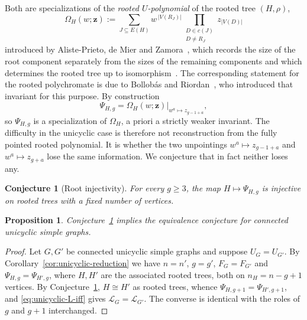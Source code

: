 \documentclass[11pt]{article}
\theoremstyle{plain}
\newtheorem{proposition}[theorem]{Proposition}
\newtheorem{conjecture}[theorem]{Conjecture}
\theoremstyle{definition}
\renewcommand{\mathcal}{\mathscr}
\newcommand{\LL}{\mathcal{L}}    %
\newcommand{\bz}{\mathbf{z}}
\numberwithin{equation}{section}
\begin{document}
Both are specializations of the \emph{rooted $U$-polynomial} of the rooted tree $(H,\rho)$,
\begin{equation}\label{eq:rooted-U}
 \Omega_H(w;\bz)    :=
 \sum_{J\subseteq E(H)} w^{\,|V(R_J)|}
     \prod_{\substack{D\in c(J)\\D\ne R_J}} z_{|V(D)|}
\end{equation}
introduced by Aliste-Prieto, de Mier and Zamora~\cite{ADZ},
which records the size of the root
component separately from the sizes of the remaining components and which
determines the rooted tree up to isomorphism~\cite[Theorem~9]{ADZ}.
The corresponding statement for the rooted
polychromate is due to Bollob\'as and Riordan~\cite{BR}, who introduced that
invariant for this purpose.  By construction
\begin{equation}\label{eq:Psi-from-Omega}
   \Psi_{H,g}
   =
   \left.\Omega_H(w;\bz)\right|_{w^a\mapsto z_{g-1+a}},
\end{equation}
so $\Psi_{H,g}$ is a specialization of $\Omega_H$, a priori a strictly weaker
invariant.  The difficulty in the unicyclic case is therefore not
reconstruction from the fully pointed rooted polynomial.  It is whether the two
unpointings $w^a\mapsto z_{g-1+a}$ and $w^a\mapsto z_{g+a}$ lose the same information.
%
We conjecture that in fact neither loses any.

\begin{conjecture}[Root injectivity]\label{conj:root-injectivity}
For every $g\ge 3$, the map $H\mapsto \Psi_{H,g}$ is injective on rooted trees
with a fixed number of vertices.
\end{conjecture}

\begin{proposition}\label{prop:root-injectivity-implies}
Conjecture~\ref{conj:root-injectivity} implies the equivalence conjecture for
connected unicyclic simple graphs.
\end{proposition}

\begin{proof}
Let $G,G'$ be connected unicyclic simple graphs and suppose $U_G=U_{G'}$.  By
Corollary~\ref{cor:unicyclic-reduction} we have $n=n'$, $g=g'$,
$F_G=F_{G'}$ and $\Psi_{H,g}=\Psi_{H',g}$, where $H,H'$ are the associated rooted
trees, both on $n_H=n-g+1$ vertices.  By
Conjecture~\ref{conj:root-injectivity}, $H\cong H'$ as rooted trees, whence
$\Psi_{H,g+1}=\Psi_{H',g+1}$, and \eqref{eq:unicyclic-L-iff} gives
$\LL_G=\LL_{G'}$.  The converse is identical with the roles of $g$ and $g+1$
interchanged.
\end{proof}
\end{document}
